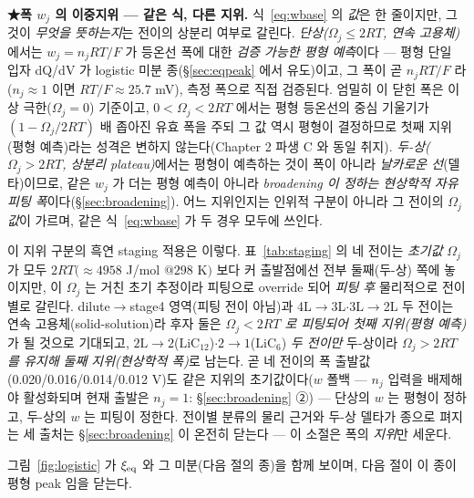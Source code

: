 \textbf{★폭 $w_j$ 의 이중지위 --- 같은 식, 다른 지위.} 식~\eqref{eq:wbase} 의 \emph{값}은 한 줄이지만, 그것이
\emph{무엇을 뜻하는지}는 전이의 상분리 여부로 갈린다. \emph{단상($\Omega_j\le2RT$, 연속 고용체)}에서는 $w_j=n_jRT/F$
가 등온선 폭에 대한 \emph{검증 가능한 평형 예측}이다 --- 평형 단일 입자 dQ/dV 가 logistic
미분 종(\S\ref{sec:eqpeak} 에서 유도)이고, 그 폭이 곧 $n_jRT/F$ 라($n_j\!\approx\!1$ 이면 $RT/F\!\approx\!25.7$ mV), 측정 폭으로 직접 검증된다. 엄밀히 이 닫힌 폭은 이상 극한($\Omega_j=0$) 기준이고,
$0<\Omega_j<2RT$ 에서는 평형 등온선의 중심 기울기가 $(1-\Omega_j/2RT)$ 배 좁아진 유효 폭을 주되 그
값 역시 평형이 결정하므로 첫째 지위(평형 예측)라는 성격은 변하지 않는다(Chapter 2 파생 C 와 동일 취지).
\emph{두-상($\Omega_j>2RT$, 상분리 plateau)}에서는 평형이 예측하는 것이 폭이 아니라 \emph{날카로운 선}(델타)이므로,
같은 $w_j$ 가 더는 평형 예측이 아니라 \emph{broadening 이 정하는 현상학적 자유 피팅 폭}이다(\S\ref{sec:broadening}).
어느 지위인지는 인위적 구분이 아니라 그 전이의 \emph{$\Omega_j$ 값}이 가르며, 같은 식~\eqref{eq:wbase} 가 두 경우 모두에
쓰인다.

이 지위 구분의 흑연 staging 적용은 이렇다. 표~\ref{tab:staging} 의 네 전이는 \emph{초기값} $\Omega_j$ 가 모두 $2RT(\!\approx\!4958$ J/mol
$@298$ K$)$ 보다 커 출발점에선 전부 둘째(두-상) 쪽에 놓이지만, 이 $\Omega_j$ 는 거친 초기 추정이라 피팅으로
override 되어 \emph{피팅 후} 물리적으로 전이별로 갈린다. dilute$\to$stage4 영역(피팅 전이 아님)과
4L$\to$3L$\cdot$3L$\to$2L 두 전이는
연속 고용체(solid-solution)라 후자 둘은 \emph{$\Omega_j<2RT$ 로 피팅되어 첫째 지위(평형 예측)}가 될 것으로 기대되고,
$2\mathrm L\!\to\!2$($\mathrm{LiC_{12}}$)$\cdot$$2\!\to\!1$($\mathrm{LiC_6}$) \emph{두 전이만} 두-상이라
\emph{$\Omega_j>2RT$ 를 유지해 둘째 지위(현상학적 폭)}로 남는다. 곧 네 전이의 폭 출발값(0.020/0.016/0.014/0.012 V)도 같은 지위의 초기값이다($w$ 폴백 --- $n_j$ 입력을
배제해야 활성화되며 현재 출발은 $n_j{=}1$: \S\ref{sec:broadening} ②) --- 단상의 $w$ 는 평형이
정하고, 두-상의 $w$ 는 피팅이 정한다. 전이별 분류의 물리 근거와 두-상 델타가 종으로 펴지는 세 출처는
\S\ref{sec:broadening} 이 온전히 닫는다 --- 이 소절은 폭의 \emph{지위}만 세운다.

그림~\ref{fig:logistic} 가 $\xi_{\mathrm{eq}}$ 와 그 미분(다음 절의 종)을 함께 보이며, 다음 절이 이 종이 평형 peak 임을 닫는다.

